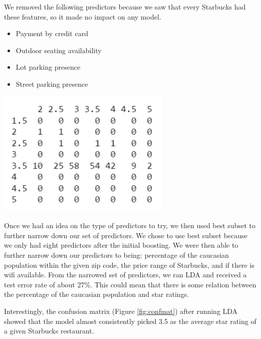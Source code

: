\documentclass{article}
\newenvironment{Figure}
  {\par\medskip\noindent\minipage{\linewidth}}
  {\endminipage\par\medskip}
\begin{document}
\begin{multicols}{2}
We removed the following predictors because we saw that every Starbucks had these features, so it made no impact on any model.

\begin{itemize}[noitemsep,topsep=8pt,parsep=0pt,partopsep=0pt]
\item Payment by credit card
\item Outdoor seating availability
\item Lot parking presence
\item Street parking presence
\end{itemize}

\begin{Figure}
\centering
   \includegraphics[width=\linewidth]{confusionMatrixLda}
	\label{fig:confmat}
\end{Figure}

Once we had an idea on the type of predictors to try, we then used best subset to further narrow down our set of predictors. We chose to use best subset because we only had eight predictors after the initial boosting. We were then able to further narrow down our predictors to being: percentage of the caucasian population within the given zip code, the price range of Starbucks, and if there is wifi available. From the narrowed set of predictors, we ran LDA and received a test error rate of about 27\%. This could mean that there is some relation between the percentage of the caucasian population and star ratings. 

Interestingly, the confusion matrix (Figure \ref{fig:confmat}) after running LDA showed that the model almost consistently picked 3.5 as the average star rating of a given Starbucks restaurant.


\end{multicols}
\end{document}
